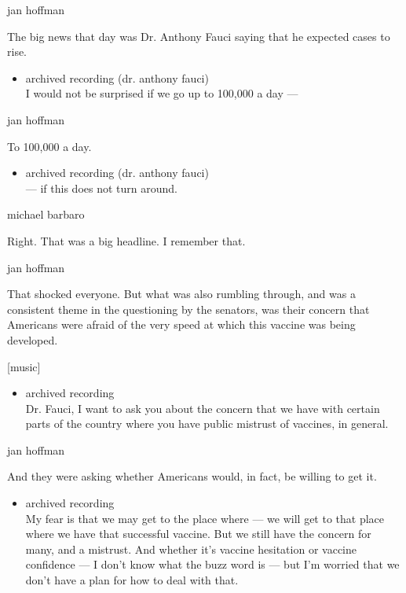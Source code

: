 jan hoffman

The big news that day was Dr. Anthony Fauci saying that he expected
cases to rise.

\begin{itemize}
\tightlist
\item
  archived recording (dr. anthony fauci)\\
  I would not be surprised if we go up to 100,000 a day ---
\end{itemize}

jan hoffman

To 100,000 a day.

\begin{itemize}
\tightlist
\item
  archived recording (dr. anthony fauci)\\
  --- if this does not turn around.
\end{itemize}

michael barbaro

Right. That was a big headline. I remember that.

jan hoffman

That shocked everyone. But what was also rumbling through, and was a
consistent theme in the questioning by the senators, was their concern
that Americans were afraid of the very speed at which this vaccine was
being developed.

{[}music{]}

\begin{itemize}
\tightlist
\item
  archived recording\\
  Dr. Fauci, I want to ask you about the concern that we have with
  certain parts of the country where you have public mistrust of
  vaccines, in general.
\end{itemize}

jan hoffman

And they were asking whether Americans would, in fact, be willing to get
it.

\begin{itemize}
\tightlist
\item
  archived recording\\
  My fear is that we may get to the place where --- we will get to that
  place where we have that successful vaccine. But we still have the
  concern for many, and a mistrust. And whether it's vaccine hesitation
  or vaccine confidence --- I don't know what the buzz word is --- but
  I'm worried that we don't have a plan for how to deal with that.
\end{itemize}

